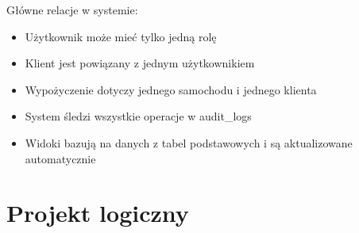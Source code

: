 \documentclass[12pt]{article}
\begin{document}
Główne relacje w systemie:
\begin{itemize}
    \item Użytkownik może mieć tylko jedną rolę
    \item Klient jest powiązany z jednym użytkownikiem
    \item Wypożyczenie dotyczy jednego samochodu i jednego klienta
    \item System śledzi wszystkie operacje w audit\_logs
    \item Widoki bazują na danych z tabel podstawowych i są aktualizowane automatycznie
\end{itemize}

\section{Projekt logiczny}
\end{document}

